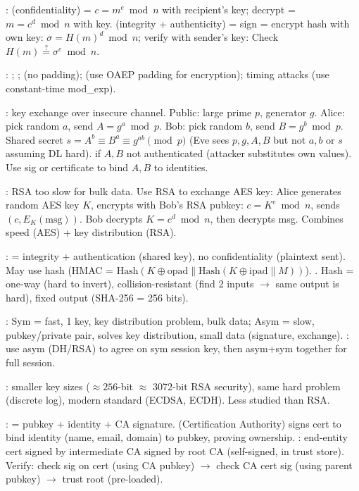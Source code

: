 :  (confidentiality) = $c = m^e \bmod n$ with recipient's  key; decrypt = $m = c^d \bmod n$ with  key.  (integrity + authenticity) = sign = encrypt hash with own  key: $\sigma = H(m)^d \bmod n$; verify with sender's  key:  Check $H(m) \stackrel{?}{=} \sigma^e \bmod n$.

: ; ;  (no padding);  (use OAEP padding for encryption); timing attacks (use constant-time mod\_exp).

: key exchange over insecure channel. Public: large prime $p$, generator $g$. Alice: pick random $a$, send $A = g^a \bmod p$. Bob: pick random $b$, send $B = g^b \bmod p$. Shared secret $s = A^b \equiv B^a \equiv g^{ab} \pmod{p}$ (Eve sees $p, g, A, B$ but not $a, b$ or $s$ assuming DL hard).  if $A, B$ not authenticated (attacker substitutes own values). Use sig or certificate to bind $A, B$ to identities.

: RSA too slow for bulk data. Use RSA to exchange AES key: Alice generates random AES key $K$, encrypts with Bob's RSA pubkey: $c = K^e \bmod n$, sends $(c, E_{K}(\text{msg}))$. Bob decrypts $K = c^d \bmod n$, then decrypts msg. Combines speed (AES) + key distribution (RSA).

:  = integrity + authentication (shared key), no confidentiality (plaintext sent). May use hash (HMAC = $\text{Hash}(K \oplus \text{opad} \parallel \text{Hash}(K \oplus \text{ipad} \parallel M))$). . Hash = one-way (hard to invert), collision-resistant (find 2 inputs $\to$ same output is hard), fixed output (SHA-256 = 256 bits).

: Sym = fast, 1 key, key distribution problem, bulk data; Asym = slow, pubkey/private pair, solves key distribution, small data (signature, exchange). : use asym (DH/RSA) to agree on sym session key, then asym+sym together for full session.

: smaller key sizes ($\approx 256$-bit $\approx$ 3072-bit RSA security), same hard problem (discrete log), modern standard (ECDSA, ECDH). Less studied than RSA.

:  = pubkey + identity + CA signature.  (Certification Authority) signs cert to bind identity (name, email, domain) to pubkey, proving ownership. : end-entity cert signed by intermediate CA signed by root CA (self-signed, in trust store). Verify: check sig on cert (using CA pubkey) $\to$ check CA cert sig (using parent pubkey) $\to$ trust root (pre-loaded).

